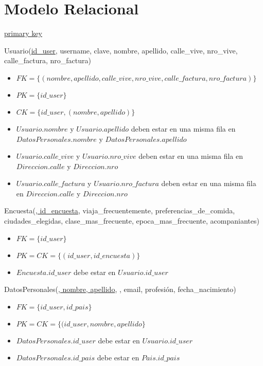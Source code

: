 \section{Modelo Relacional}

\begin{framed} \centering
  \underline{primary key} \hspace*{3cm}
\end{framed}

\vspace*{0.5cm}
\noindent
Usuario(\underline{id\_user}, username, clave, nombre, apellido,
	calle\_vive, nro\_vive, calle\_factura, nro\_factura)
\begin{itemize}
	\item $FK = \{(nombre, apellido, calle\_vive, nro\_vive, calle\_factura,
		nro\_factura)\}$
	\item $PK = \{id\_user\}$
	\item $CK = \{id\_user, (nombre, apellido)\}$
	\item $Usuario.nombre$ y $Usuario.apellido$ deben estar en una misma fila
		en $DatosPersonales.nombre$ y $DatosPersonales.apellido$
	\item $Usuario.calle\_vive$ y $Usuario.nro\_vive$ deben estar en una misma
		fila en $Direccion.calle$ y $Direccion.nro$
	\item $Usuario.calle\_factura$ y $Usuario.nro\_factura$ deben estar en una
		misma fila en $Direccion.calle$ y $Direccion.nro$
\end{itemize}


\vspace*{0.5cm}
\noindent
Encuesta(\underline{, id\_encuesta},
	viaja\_frecuentemente, preferencias\_de\_comida, ciudades\_elegidas,
	clase\_mas\_frecuente, epoca\_mas\_frecuente, acompaniantes)
\begin{itemize}
	\item $FK = \{id\_user\}$
	\item $PK = CK = \{(id\_user, id\_encuesta)\}$
	\item $Encuesta.id\_user$ debe estar en $Usuario.id\_user$
\end{itemize}

\vspace*{0.5cm}
\noindent
DatosPersonales(\underline{, nombre, apellido},
	, email, profesión, fecha\_nacimiento)
\begin{itemize}
	\item $FK = \{id\_user, id\_pais\}$
	\item $PK = CK = \{(id\_user, nombre, apellido\}$
	\item $DatosPersonales.id\_user$ debe estar en $Usuario.id\_user$
	\item $DatosPersonales.id\_pais$ debe estar en $Pais.id\_pais$
\end{itemize}

